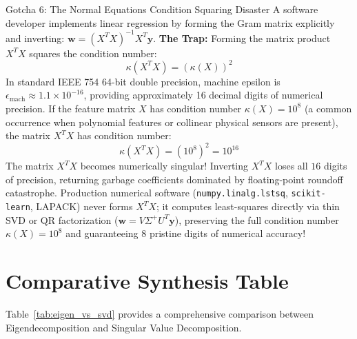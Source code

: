 \begin{trapbox}{Gotcha 6: The Normal Equations Condition Squaring Disaster}
A software developer implements linear regression by forming the Gram matrix explicitly and inverting: $\mathbf{w} = (X^T X)^{-1} X^T \mathbf{y}$.
\textbf{The Trap:} Forming the matrix product $X^T X$ squares the condition number:
\begin{equation*}
\kappa(X^T X) = (\kappa(X))^2
\end{equation*}
In standard IEEE 754 64-bit double precision, machine epsilon is $\epsilon_{\text{mach}} \approx 1.1 \times 10^{-16}$, providing approximately 16 decimal digits of numerical precision. If the feature matrix $X$ has condition number $\kappa(X) = 10^8$ (a common occurrence when polynomial features or collinear physical sensors are present), the matrix $X^T X$ has condition number:
\begin{equation*}
\kappa(X^T X) = (10^8)^2 = 10^{16}
\end{equation*}
The matrix $X^T X$ becomes numerically singular! Inverting $X^T X$ loses all $16$ digits of precision, returning garbage coefficients dominated by floating-point roundoff catastrophe. Production numerical software (\texttt{numpy.linalg.lstsq}, \texttt{scikit-learn}, LAPACK) never forms $X^T X$; it computes least-squares directly via thin SVD or QR factorization ($\mathbf{w} = V \Sigma^+ U^T \mathbf{y}$), preserving the full condition number $\kappa(X) = 10^8$ and guaranteeing 8 pristine digits of numerical accuracy!
\end{trapbox}

\section{Comparative Synthesis Table}

Table~\ref{tab:eigen_vs_svd} provides a comprehensive comparison between Eigendecomposition and Singular Value Decomposition.

